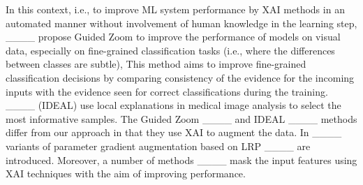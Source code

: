 In this context, i.e., to improve ML system performance by XAI methods in an automated manner without involvement of human knowledge in the learning step, ____ propose Guided Zoom to improve the performance of models on visual data, especially on fine-grained classification tasks (i.e., where the differences between classes are subtle),  This method aims to improve fine-grained classification decisions by comparing consistency of the evidence for the incoming inputs with the evidence seen for correct classifications during the training. %
____ (IDEAL) use local explanations in medical image analysis to select the most informative samples. %
The Guided Zoom ____ and IDEAL ____ methods differ from our approach in that they use XAI to augment the data. 
In ____ variants of parameter gradient augmentation based on LRP ____ are introduced.%
Moreover, a number of methods ____ mask the input features using XAI techniques with the aim of improving performance. %


